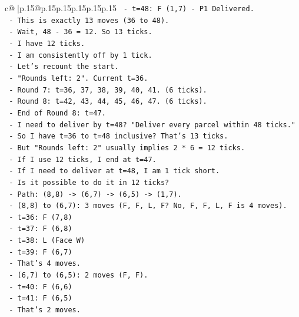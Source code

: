 \documentclass{article}
\begin{document}
{\begin{supertabular}{c@{$\;$}|p{.15\linewidth}@{}p{.15\linewidth}p{.15\linewidth}p{.15\linewidth}p{.15\linewidth}p{.15\linewidth}}
{{{\texttt{        {-} t=48: F (1,7) {-} P1 Delivered.} \\
\texttt{        {-} This is exactly 13 moves (36 to 48).} \\
\texttt{        {-} Wait, 48 {-} 36 = 12. So 13 ticks.} \\
\texttt{        {-} I have 12 ticks.} \\
\texttt{        {-} I am consistently off by 1 tick.} \\
\texttt{        {-} Let's recount the start.} \\
\texttt{        {-} "Rounds left: 2". Current t=36.} \\
\texttt{        {-} Round 7: t=36, 37, 38, 39, 40, 41. (6 ticks).} \\
\texttt{        {-} Round 8: t=42, 43, 44, 45, 46, 47. (6 ticks).} \\
\texttt{        {-} End of Round 8: t=47.} \\
\texttt{        {-} I need to deliver by t=48? "Deliver every parcel within 48 ticks."} \\
\texttt{        {-} So I have t=36 to t=48 inclusive? That's 13 ticks.} \\
\texttt{        {-} But "Rounds left: 2" usually implies 2 * 6 = 12 ticks.} \\
\texttt{        {-} If I use 12 ticks, I end at t=47.} \\
\texttt{        {-} If I need to deliver at t=48, I am 1 tick short.} \\
\texttt{        {-} Is it possible to do it in 12 ticks?} \\
\texttt{        {-} Path: (8,8) {-}> (6,7) {-}> (6,5) {-}> (1,7).} \\
\texttt{        {-} (8,8) to (6,7): 3 moves (F, F, L, F? No, F, F, L, F is 4 moves).} \\
\texttt{          {-} t=36: F (7,8)} \\
\texttt{          {-} t=37: F (6,8)} \\
\texttt{          {-} t=38: L (Face W)} \\
\texttt{          {-} t=39: F (6,7)} \\
\texttt{          {-} That's 4 moves.} \\
\texttt{        {-} (6,7) to (6,5): 2 moves (F, F).} \\
\texttt{          {-} t=40: F (6,6)} \\
\texttt{          {-} t=41: F (6,5)} \\
\texttt{          {-} That's 2 moves.} \\
}}}
\end{supertabular}}
\end{document}
